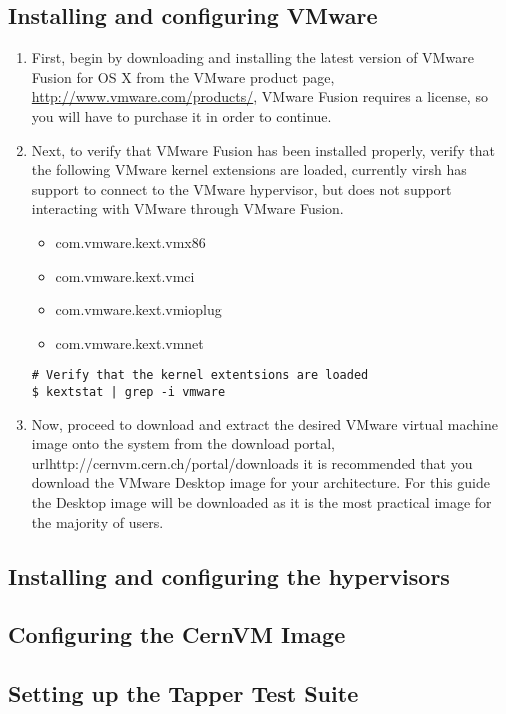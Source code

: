 \subsection{Installing and configuring VMware}
\label{sec:osxvmware}
\begin{enumerate}
\item	First, begin by downloading and installing the latest version of VMware Fusion for OS X from the VMware product 
		page, \url{http://www.vmware.com/products/}, VMware Fusion requires a license, so you will have to purchase it
		in order to continue.
		
\item	Next, to verify that VMware Fusion has been installed properly, verify that the following VMware kernel extensions 
		are loaded, currently virsh has support to connect to the VMware hypervisor, but does not support interacting with
		VMware through VMware Fusion.
		
\begin{itemize}
\item	com.vmware.kext.vmx86
\item	com.vmware.kext.vmci
\item	com.vmware.kext.vmioplug
\item	com.vmware.kext.vmnet
\end{itemize}

\lstset{language=bash,caption=Verify VMware Kernel Extensions Loaded}
\begin{lstlisting}
# Verify that the kernel extentsions are loaded
$ kextstat | grep -i vmware
\end{lstlisting}

\item	Now, proceed to download and extract the desired VMware virtual machine image onto the system from the \cernvm download 
		portal, url{http://cernvm.cern.ch/portal/downloads} it is recommended that you download the VMware Desktop image for your 
		architecture. For this guide the Desktop image will be downloaded as it is the most practical image for the majority of 
		users.


\end{enumerate}




\newpage
\subsection{Installing and configuring the hypervisors}
\subsection{Configuring the CernVM Image}
\subsection{Setting up the Tapper Test Suite}